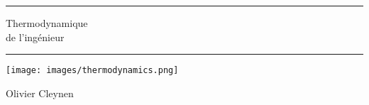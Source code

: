 \begin{titlepage}

\vspace*{6cm}
\begin{center}
\vspace{1em}\par \rule{15cm}{.1pt}
{\HUGE Thermodynamique\\ de l’ingénieur}
\vspace{1em}\par \rule{15cm}{.1pt}

\vspace{3cm}
\texttt{[image: images/thermodynamics.png]}
\vspace{3cm}

{\LARGE Olivier Cleynen\\
\ccLogo\ \ccAttribution\ \ccShareAlike}

\end{center}



\end{titlepage}
\restoregeometry

